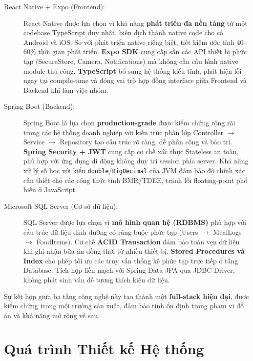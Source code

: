 \documentclass[12pt,a4paper]{article}
\begin{document}
\begin{description}
    \item[React Native + Expo (Frontend):] 
    React Native được lựa chọn vì khả năng \textbf{phát triển đa nền tảng} từ một codebase TypeScript duy nhất, biên dịch thành native code cho cả Android và iOS. So với phát triển native riêng biệt, tiết kiệm ước tính 40--60\% thời gian phát triển. \textbf{Expo SDK} cung cấp sẵn các API thiết bị phức tạp (SecureStore, Camera, Notifications) mà không cần cấu hình native module thủ công. \textbf{TypeScript} bổ sung hệ thống kiểu tĩnh, phát hiện lỗi ngay tại compile-time và đóng vai trò hợp đồng interface giữa Frontend và Backend khi làm việc nhóm.
    
    \item[Spring Boot (Backend):] 
    Spring Boot là lựa chọn \textbf{production-grade} được kiểm chứng rộng rãi trong các hệ thống doanh nghiệp với kiến trúc phân lớp Controller $\rightarrow$ Service $\rightarrow$ Repository tạo cấu trúc rõ ràng, dễ phân công và bảo trì. \textbf{Spring Security + JWT} cung cấp cơ chế xác thực Stateless an toàn, phù hợp với ứng dụng di động không duy trì session phía server. Khả năng xử lý số học với kiểu \texttt{double}/\texttt{BigDecimal} của JVM đảm bảo độ chính xác cần thiết cho các công thức tính BMR/TDEE, tránh lỗi floating-point phổ biến ở JavaScript.
    
    \item[Microsoft SQL Server (Cơ sở dữ liệu):] 
    SQL Server được lựa chọn vì \textbf{mô hình quan hệ (RDBMS)} phù hợp với cấu trúc dữ liệu dinh dưỡng có ràng buộc phức tạp (Users $\to$ MealLogs $\to$ FoodItems). Cơ chế \textbf{ACID Transaction} đảm bảo toàn vẹn dữ liệu khi ghi nhận bữa ăn đồng thời từ nhiều thiết bị. \textbf{Stored Procedures và Index} cho phép tối ưu các truy vấn thống kê phức tạp trực tiếp ở tầng Database. Tích hợp liền mạch với Spring Data JPA qua JDBC Driver, không phát sinh vấn đề tương thích kiểu dữ liệu.
\end{description}

Sự kết hợp giữa ba tầng công nghệ này tạo thành một \textbf{full-stack hiện đại}, được kiểm chứng trong môi trường sản xuất, đảm bảo tính ổn định trong phạm vi đồ án và khả năng mở rộng về sau.

\newpage
\section{Quá trình Thiết kế Hệ thống}
\end{document}
